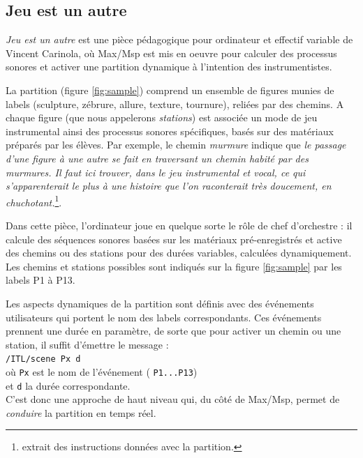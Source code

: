 \documentclass{article}
\newcommand{\OSC}[1]	{{\fontsize{9pt}{9pt} \selectfont\texttt{#1}}}
\begin{document}
\subsection{Jeu est un autre}

\emph{Jeu est un autre} est une pièce pédagogique pour ordinateur et effectif variable de Vincent Carinola, où Max/Msp est mis en oeuvre pour calculer des processus sonores et activer une partition dynamique à l'intention des instrumentistes. 

La partition (figure \ref{fig:sample}) comprend un ensemble de figures munies de labels (sculpture, zébrure, allure, texture, tournure), reliées par des chemins. A chaque figure (que nous appelerons \emph{stations}) est associée un mode de jeu instrumental ainsi des processus sonores spécifiques, basés sur des matériaux préparés par les élèves. Par exemple, le chemin \emph{murmure} indique que \emph{le passage d'une figure à une autre se fait en traversant un chemin habité par des murmures. Il faut ici trouver, dans le jeu instrumental et vocal, ce qui s'apparenterait le plus à une histoire que l'on raconterait très doucement, en chuchotant.}\footnote{extrait des instructions données avec la partition.}.


Dans cette pièce, l'ordinateur joue en quelque sorte le rôle de chef d'orchestre : il calcule des séquences sonores basées sur les matériaux pré-enregistrés et active des chemins ou des stations pour des durées variables, calculées dynamiquement. Les chemins et stations possibles sont indiqués sur la figure \ref{fig:sample} par les labels P1 à P13. 

Les aspects dynamiques de la partition sont définis avec des événements utilisateurs qui portent le nom des labels correspondants. Ces événements prennent une durée en paramètre, de sorte que pour activer un chemin ou une station, il suffit d'émettre le message :\\
\hspace*{5mm} \OSC{/ITL/scene Px d} \\
où \OSC{Px} est le nom de l'événement (\OSC{P1...P13})\\
 et \OSC{d} la durée correspondante. \\
C'est donc une approche de haut niveau qui, du côté de Max/Msp, permet de \emph{conduire} la partition en temps réel.
\end{document}
